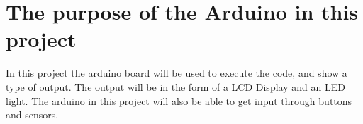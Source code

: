 \section{The purpose of the Arduino in this project}

In this project the arduino board will be used to execute the code, and show a type of output. The output will be in the form of a LCD Display and an LED light. 
The arduino in this project will also be able to get input through buttons and sensors. 
